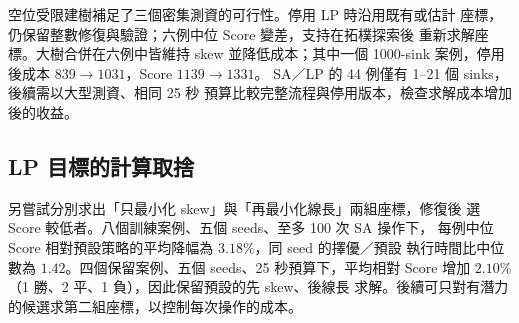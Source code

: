 \documentclass[12pt,a4paper]{article}
\begin{document}
空位受限建樹補足了三個密集測資的可行性。停用 LP 時沿用既有或估計
座標，仍保留整數修復與驗證；六例中位 Score 變差，支持在拓樸探索後
重新求解座標。大樹合併在六例中皆維持 skew 並降低成本；其中一個
1000-sink 案例，停用後成本 $839\to1031$，Score $1139\to1331$。
SA／LP 的 44 例僅有 1--21 個 sinks，後續需以大型測資、相同 25 秒
預算比較完整流程與停用版本，檢查求解成本增加後的收益。

\subsection{LP 目標的計算取捨}
另嘗試分別求出「只最小化 skew」與「再最小化線長」兩組座標，修復後
選 Score 較低者。八個訓練案例、五個 seeds、至多 100 次 SA 操作下，
每例中位 Score 相對預設策略的平均降幅為 $3.18\%$，同 seed 的擇優／預設
執行時間比中位數為 $1.42$。四個保留案例、五個 seeds、25 秒預算下，平均相對
Score 增加 $2.10\%$（1 勝、2 平、1 負），因此保留預設的先 skew、後線長
求解。後續可只對有潛力的候選求第二組座標，以控制每次操作的成本。
\end{document}
